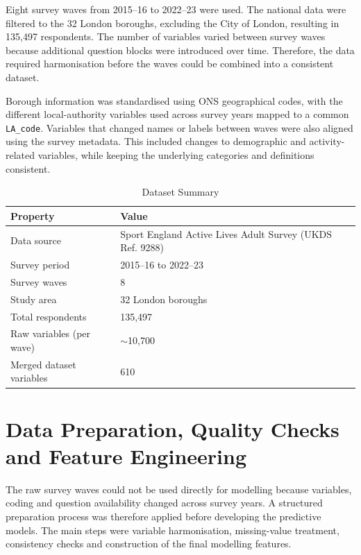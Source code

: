 \documentclass[ %
                    author={Ashrey Ashrey, Sanya Kapoor, Trisha Sharma, Yash Bhooshan Pandloskar},
                supervisor={Dr. Dalila O’Grady},
                    degree={MSc},
                     title={Using machine learning to forecast physical activity participation, volunteering and activity patterns in London},
                  subtitle={},
                      type={},
                      year={2021}]{dissertation}
\begin{document}
Eight survey waves from 2015--16 to 2022--23 were used. The national data were filtered to the 32 London boroughs, excluding the City of London, resulting in 135,497 respondents. The number of variables varied between survey waves because additional question blocks were introduced over time. Therefore, the data required harmonisation before the waves could be combined into a consistent dataset.

Borough information was standardised using ONS geographical codes, with the different local-authority variables used across survey years mapped to a common \texttt{LA\_code}. Variables that changed names or labels between waves were also aligned using the survey metadata. This included changes to demographic and activity-related variables, while keeping the underlying categories and definitions consistent.

\begin{table}[!htb]
\centering
\label{tab:dataset-summary}
\begin{tabular}{ll}
\toprule
\textbf{Property} & \textbf{Value} \\
\midrule
Data source              & Sport England Active Lives Adult Survey (UKDS Ref. 9288) \\
Survey period            & 2015--16 to 2022--23 \\
Survey waves             & 8 \\
Study area               & 32 London boroughs \\
Total respondents        & 135,497 \\
Raw variables (per wave) & $\sim$10,700 \\
Merged dataset variables & 610 \\
\bottomrule
\end{tabular}
\caption{Dataset Summary}
\end{table}

\FloatBarrier
\section{Data Preparation, Quality Checks and Feature Engineering}

\noindent
The raw survey waves could not be used directly for modelling because variables, coding and question availability changed across survey years. A structured preparation process was therefore applied before developing the predictive models. The main steps were variable harmonisation, missing-value treatment, consistency checks and construction of the final modelling features.
\end{document}
